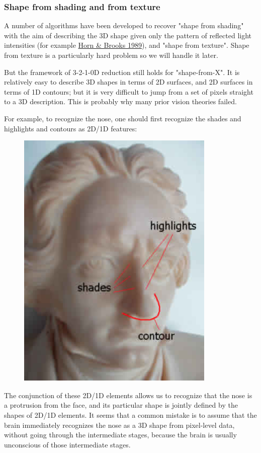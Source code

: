 \subsubsection{Shape from shading and from texture}

A number of algorithms have been developed to recover "shape from shading" with the aim of describing the 3D shape given only the pattern of reflected light intensities (for example \hyperlink{ref}{Horn \& Brooks 1989}), and "shape from texture". Shape from texture is a particularly hard problem so we will handle it later.

But  the framework of 3-2-1-0D reduction still holds for "shape-from-X". It is relatively easy to describe 3D shapes in terms of  2D surfaces, and 2D surfaces in terms of 1D contours; but it is very difficult to jump from a set of pixels straight to a 3D description. This is probably why many prior vision theories failed.

For example, to recognize the  nose, one should first recognize the shades and highlights and contours as 2D/1D features:

\begin{figure}[H]
\centering
\includegraphics[scale=0.7]{BeethovenAnalysis.png}
\end{figure}

The conjunction of these 2D/1D elements allows us to recognize that the nose is a protrusion from the face, and its particular shape is jointly defined by the shapes of  2D/1D elements. It seems that a common mistake is to assume that the brain immediately recognizes the nose as a 3D shape  from pixel-level data, without going through the intermediate stages, because the brain is usually unconscious of those intermediate stages.

